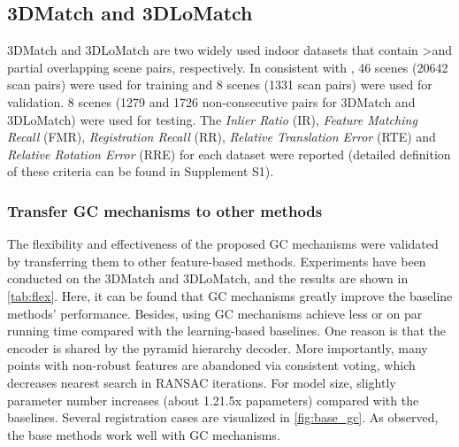 \documentclass[10pt,twocolumn,letterpaper]{article}
\begin{document}
\subsection{3DMatch and 3DLoMatch}
\vspace{-.25em}
3DMatch\cite{zeng20173dmatch} and 3DLoMatch\cite{huang2021predator} are two widely used indoor datasets that contain \textgreater  and  partial overlapping scene pairs, respectively.
In consistent with \cite{huang2021predator}, 46 scenes (20642 scan pairs) were used for training and 8 scenes (1331 scan pairs) were used for validation. 8 scenes (1279 and 1726 non-consecutive pairs for 3DMatch and 3DLoMatch) were used for testing. 
The {\em Inlier Ratio} (IR), {\em Feature Matching Recall} (FMR), {\em Registration Recall} (RR), {\em Relative Translation Error} (RTE) and {\em Relative Rotation Error} (RRE) for each dataset were reported (detailed definition of these criteria can be found in Supplement S1).

\vspace{-1.25em}
\subsubsection{Transfer GC mechanisms to other methods}
\vspace{-.25em}
The flexibility and effectiveness of the proposed GC mechanisms were validated by transferring them to other feature-based methods. Experiments have been conducted on the 3DMatch and 3DLoMatch, and the results are shown in \cref{tab:flex}. Here, it can be found that GC mechanisms greatly improve the baseline methods' performance.  Besides, using GC mechanisms achieve less or on par running time compared with the learning-based baselines. One reason is that the encoder is shared by the pyramid hierarchy decoder. More importantly, many points with non-robust features are abandoned via consistent voting, which decreases nearest search in RANSAC iterations. For model size, slightly parameter number increases (about 1.21.5x papameters) compared with the baselines. Several registration cases are visualized in \cref{fig:base_gc}. As observed, the base methods work well with GC mechanisms.
\end{document}
